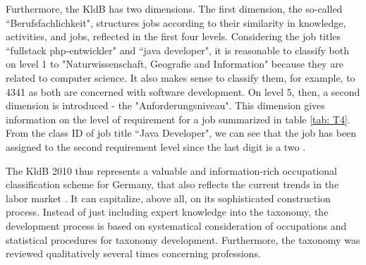 \documentclass[12pt, a4paper, titlepage]{article}
\begin{document}
Furthermore, the \ac{KldB} has two dimensions. The first dimension, the so-called ``Berufsfachlichkeit", structures jobs according to their similarity in knowledge, activities, and jobs, reflected in the first four levels. Considering the job titles ``fullstack php-entwickler" and ``java developer", it is reasonable to classify both on level 1 to "Naturwissenschaft, Geografie and Information" because they are related to computer science. It also makes sense to classify them, for example, to 4341 as both are concerned with software development. On level 5, then, a second dimension is introduced - the "Anforderungsniveau". This dimension gives information on the level of requirement for a job summarized in table \ref{tab: T4}. From the class ID of job title ``Java Developer", we can see that the job has been assigned to the second requirement level since the last digit is a two \citep{Bundesagentur2011a, Bundesagentur2011b, Paulus2013}. 

\begin{table}[hb!]
  \caption[Level of Requirements on Level 5]{\label{tab: T4} Level of Requirements on Level 5 (adapted from \citep[2]{Bundesagentur2011b})}
  \end{table}

The \ac{KldB} 2010 thus represents a valuable and information-rich occupational classification scheme for Germany, that also reflects the current trends in the labor market \citep{Paulus2013}. It can capitalize, above all, on its sophisticated construction process. Instead of just including expert knowledge into the taxonomy, the development process is based on systematical consideration of occupations and statistical procedures for taxonomy development. Furthermore, the taxonomy was reviewed qualitatively several times concerning professions. 
\end{document}
